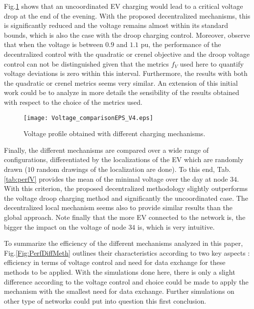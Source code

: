 \documentclass[journal]{IEEEtran}
\begin{document}
Fig.\ref{Fig:VDiffApp} shows that an uncoordinated EV charging would lead to a critical voltage drop at the end of the evening. With the proposed decentralized mechanisms, this is significantly reduced and the voltage remains almost within its standard bounds, which is also the case with the droop charging control. Moreover, observe that when the voltage is between $0.9$ and $1.1$ pu, the performance of the decentralized control with the quadratic or crenel objective and the droop voltage control can not be distinguished given that the metrics $f_V$ used here to quantify voltage deviations is zero within this interval. Furthermore, the results with both the quadratic or crenel metrics seems very similar. An extension of this initial work could be to analyze in more details the sensibility of the results obtained with respect to the choice of the metrics used.

\begin{figure}[!htbp]
\texttt{[image: Voltage\_comparisonEPS\_V4.eps]}
\caption{Voltage profile obtained with different charging mechanisms.}
\label{Fig:VDiffApp}
\end{figure}



Finally, the different mechanisms are compared over a wide range of configurations, differentiated by the localizations of the EV which are randomly drawn ($10$ random drawings of the localization are done). To this end, Tab.\ref{tab:perfV} provides the mean of the minimal voltage over the day at node $34$. With this criterion, the proposed decentralized methodology slightly outperforms the voltage droop charging method and significantly the uncoordinated case. The decentralized local mechanism seems also to provide similar results than the global approach. Note finally that the more EV connected to the network is, the bigger the impact on the voltage of node $34$ is, which is very intuitive. 

To summarize the efficiency of the different mechanisms analyzed in this paper, Fig.\ref{Fig:PerfDiffMeth} outlines their characteristics according to two key aspects : efficiency in terms of voltage control and need for data exchange for these methods to be applied. With the simulations done here, there is only a slight difference according to the voltage control and choice could be made to apply the mechanism with the smallest need for data exchange. Further simulations on other type of networks could put into question this first conclusion.
\end{document}

